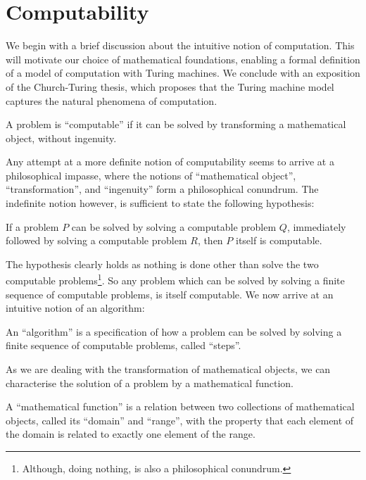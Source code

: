 \chapter{Computability}


We begin with a brief discussion about the intuitive notion of computation.
This will motivate our choice of mathematical foundations, enabling a formal
definition of a model of computation with Turing machines. We conclude with an
exposition of the Church-Turing thesis, which proposes that the Turing
machine model captures the natural phenomena of computation.

\begin{notion} A problem is ``computable'' if it can be solved by transforming
a mathematical object, without ingenuity.
\end{notion}

Any attempt at a more definite notion of computability seems to arrive at a
philosophical impasse, where the notions of ``mathematical object'',
``transformation'', and ``ingenuity'' form a philosophical conundrum. The
indefinite notion however, is sufficient to state the following hypothesis:

\begin{hypothesis} \label{ths:problem-composition} If a problem $P$ can be
solved by solving a computable problem $Q$, immediately followed by solving a
computable problem $R$, then $P$ itself is computable. \end{hypothesis}

The hypothesis clearly holds as nothing is done other than solve the two
computable problems\footnote{Although, doing nothing, is also a philosophical
conundrum.}.  So any problem which can be solved by solving a finite sequence
of computable problems, is itself computable. We now arrive at an intuitive
notion of an algorithm:

\begin{notion} \label{ntn:problem-algorithm} An ``algorithm'' is a
specification of how a problem can be solved by solving a finite sequence of
computable problems, called ``steps''.\end{notion}

As we are dealing with the transformation of mathematical objects, we can
characterise the solution of a problem by a mathematical function.

\begin{notion} A ``mathematical function'' is a relation between two
collections of mathematical objects, called its ``domain'' and ``range'', with
the property that each element of the domain is related to exactly one element
of the range. \end{notion}

